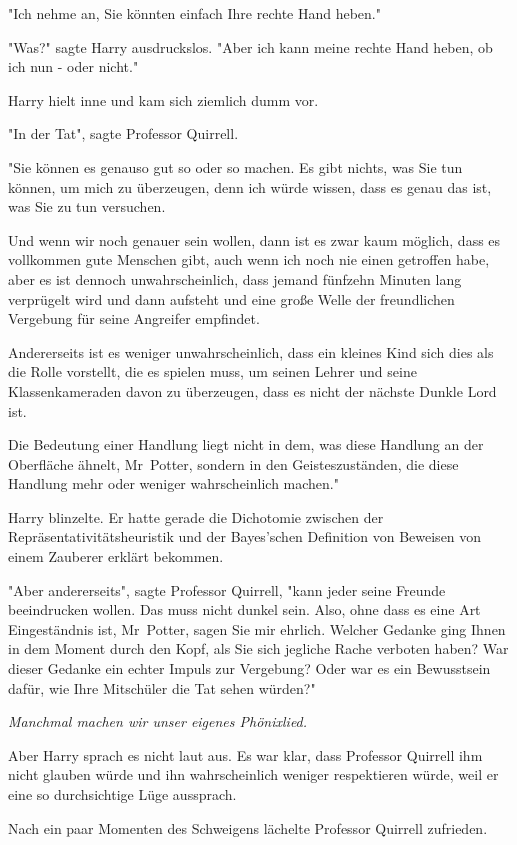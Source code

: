 {"Ich nehme an, Sie könnten einfach Ihre rechte Hand heben."

"Was?" sagte Harry ausdruckslos. "Aber ich kann meine rechte Hand heben, ob ich nun - oder nicht."

Harry hielt inne und kam sich ziemlich dumm vor.

"In der Tat", sagte Professor Quirrell.

"Sie können es genauso gut so oder so machen. Es gibt nichts, was Sie tun können, um mich zu überzeugen, denn ich würde wissen, dass es genau das ist, was Sie zu tun versuchen.

Und wenn wir noch genauer sein wollen, dann ist es zwar kaum möglich, dass es vollkommen gute Menschen gibt, auch wenn ich noch nie einen getroffen habe, aber es ist dennoch unwahrscheinlich, dass jemand fünfzehn Minuten lang verprügelt wird und dann aufsteht und eine große Welle der freundlichen Vergebung für seine Angreifer empfindet.

Andererseits ist es weniger unwahrscheinlich, dass ein kleines Kind sich dies als die Rolle vorstellt, die es spielen muss, um seinen Lehrer und seine Klassenkameraden davon zu überzeugen, dass es nicht der nächste Dunkle Lord ist.

Die Bedeutung einer Handlung liegt nicht in dem, was diese Handlung an der Oberfläche ähnelt, Mr~Potter, sondern in den Geisteszuständen, die diese Handlung mehr oder weniger wahrscheinlich machen."

Harry blinzelte. Er hatte gerade die Dichotomie zwischen der Repräsentativitätsheuristik und der Bayes'schen Definition von Beweisen von einem Zauberer erklärt bekommen.

"Aber andererseits", sagte Professor Quirrell, "kann jeder seine Freunde beeindrucken wollen. Das muss nicht dunkel sein. Also, ohne dass es eine Art Eingeständnis ist, Mr~Potter, sagen Sie mir ehrlich. Welcher Gedanke ging Ihnen in dem Moment durch den Kopf, als Sie sich jegliche Rache verboten haben? War dieser Gedanke ein echter Impuls zur Vergebung? Oder war es ein Bewusstsein dafür, wie Ihre Mitschüler die Tat sehen würden?"

\emph{Manchmal machen wir unser eigenes Phönixlied.}

Aber Harry sprach es nicht laut aus. Es war klar, dass Professor Quirrell ihm nicht glauben würde und ihn wahrscheinlich weniger respektieren würde, weil er eine so durchsichtige Lüge aussprach.

Nach ein paar Momenten des Schweigens lächelte Professor Quirrell zufrieden.

}
